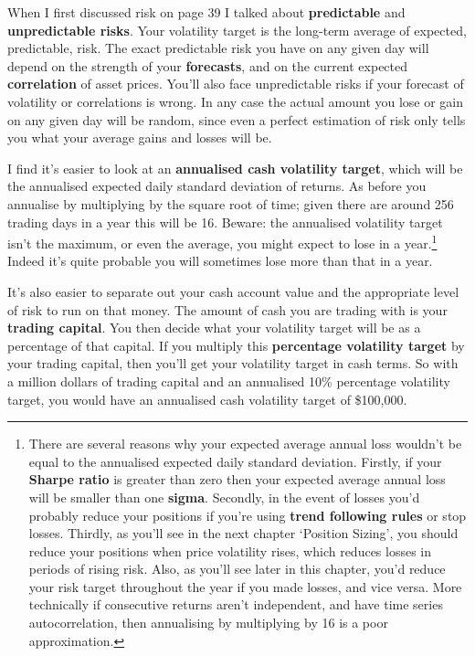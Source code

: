 When I first discussed risk on page 39 I talked about \textbf{predictable} and \textbf{unpredictable risks}. Your volatility target is the long-term average of expected, predictable, risk. The exact predictable risk you have on any given day will depend on the strength of your \textbf{forecasts}, and on the current expected \textbf{correlation} of asset prices. You'll also face unpredictable risks if your forecast of volatility or correlations is wrong. In any case the actual amount you lose or gain on any given day will be random, since even a perfect estimation of risk only tells you what your average gains and losses will be.

I find it's easier to look at an \textbf{annualised cash volatility target}, which will be the annualised expected daily standard deviation of returns. As before you annualise by multiplying by the square root of time; given there are around 256 trading days in a year this will be 16. Beware: the annualised volatility target isn't the maximum, or even the average, you might expect to lose in a year.\footnote{There are several reasons why your expected average annual loss wouldn't be equal to the annualised expected daily standard deviation. Firstly, if your \textbf{Sharpe ratio} is greater than zero then your expected average annual loss will be smaller than one \textbf{sigma}. Secondly, in the event of losses you'd probably reduce your positions if you're using \textbf{trend following rules} or stop losses. Thirdly, as you'll see in the next chapter ‘Position Sizing', you should reduce your positions when price volatility rises, which reduces losses in periods of rising risk. Also, as you'll see later in this chapter, you'd reduce your risk target throughout the year if you made losses, and vice versa. More technically if consecutive returns aren't independent, and have time series autocorrelation, then annualising by multiplying by 16 is a poor approximation.} Indeed it's quite probable you will sometimes lose more than that in a year.

It's also easier to separate out your cash account value and the appropriate level of risk to run on that money. The amount of cash you are trading with is your \textbf{trading capital}. You then decide what your volatility target will be as a percentage of that capital. If you multiply this \textbf{percentage volatility target} by your trading capital, then you'll get your volatility target in cash terms. So with a million dollars of trading capital and an annualised 10\% percentage volatility target, you would have an annualised cash volatility target of \$100,000.

